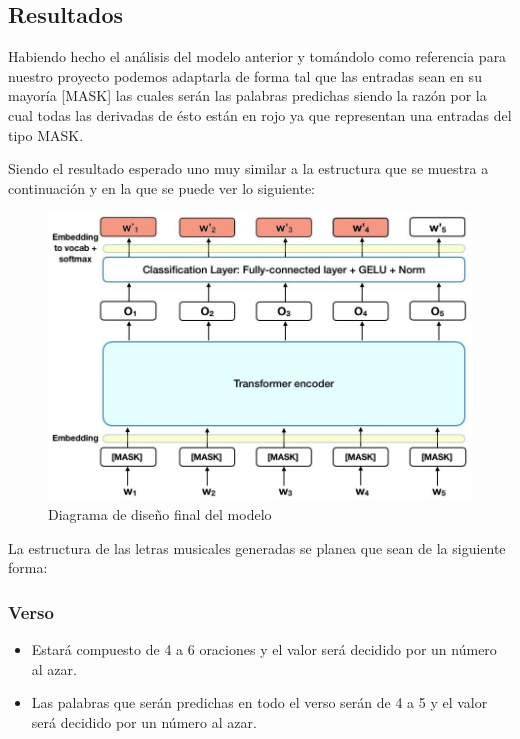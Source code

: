 \documentclass[12pt, a4paper, titlepage]{report}
\begin{document}
		\subsection{Resultados} %
		
		Habiendo hecho el análisis del modelo anterior y tomándolo como referencia para nuestro proyecto podemos adaptarla de forma tal que las entradas sean en su mayoría [MASK] las cuales serán las palabras predichas siendo la razón por la cual todas las derivadas de ésto están en rojo ya que representan una entradas del tipo MASK. 
		
		
		Siendo el resultado esperado uno muy similar a la estructura que se muestra a continuación y en la que se puede ver lo siguiente:\\
		\begin{figure}[H]
			\includegraphics[width=12cm]{./imagenes/Disenio/Iteracion_3/bert_output_model.png}
			\centering 
			\caption{Diagrama de diseño final del modelo}
		\end{figure}
	

		
		La estructura de las letras musicales generadas se planea que sean de la siguiente forma:		
		
		\subsubsection*{Verso}
		\begin{itemize}
			\item Estará compuesto de 4 a 6 oraciones y el valor será decidido por un número al azar.
			\item Las palabras que serán predichas en todo el verso serán de 4 a 5 y el valor será decidido por un número al azar.
		\end{itemize}
		
\end{document}
